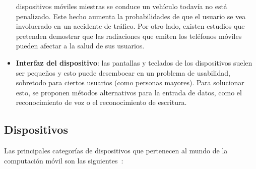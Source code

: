 \begin{itemize}
dispositivos móviles miestras se conduce un vehículo todavía no está
penalizado. Este hecho aumenta la probabilidades de que el usuario se vea
involucrado en un accidente de tráfico. Por otro lado, existen estudios que
pretenden demostrar que las radiaciones que emiten los teléfonos móviles 
pueden afectar a la salud de sus usuarios.
\item \textbf{Interfaz del dispositivo}: las pantallas y teclados de los
dispositivos suelen ser pequeños y esto puede desembocar en un problema de
usabilidad, sobretodo para ciertos usuarios (como personas mayores).
Para solucionar esto, se proponen métodos alternativos para la entrada de
datos, como el reconocimiento de voz o el reconocimiento de escritura.
\end{itemize}

  \subsection{Dispositivos}
Las principales categorías de dispositivos que pertenecen al mundo de la
computación móvil son las siguientes~\cite{bib:wikiMobileComputing}:

